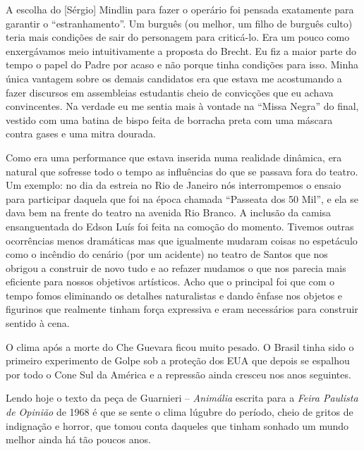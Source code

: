 A escolha do {[}Sérgio{]} Mindlin para fazer o operário foi pensada
exatamente para garantir o “estranhamento”. Um burguês (ou melhor, um
filho de burguês culto) teria mais condições de sair do personagem para
criticá-lo. Era um pouco como enxergávamos meio intuitivamente a
proposta do Brecht. Eu fiz a maior parte do tempo o papel do Padre por
acaso e não porque tinha condições para isso. Minha única vantagem sobre
os demais candidatos era que estava me acostumando a fazer discursos em
assembleias estudantis cheio de convicções que eu achava convincentes.
Na verdade eu me sentia mais à vontade na “Missa Negra” do final,
vestido com uma batina de bispo feita de borracha preta com uma máscara
contra gases e uma mitra dourada.

Como era uma performance que estava inserida numa realidade dinâmica,
era natural que sofresse todo o tempo as influências do que se passava
fora do teatro. Um exemplo: no dia da estreia no Rio de Janeiro nós
interrompemos o ensaio para participar daquela que foi na época chamada
“Passeata dos 50 Mil”, e ela se dava bem na frente do teatro na avenida
Rio Branco. A inclusão da camisa ensanguentada do Edson Luís foi feita
na comoção do momento. Tivemos outras ocorrências menos dramáticas mas
que igualmente mudaram coisas no espetáculo como o incêndio do cenário
(por um acidente) no teatro de Santos que nos obrigou a construir de
novo tudo e ao refazer mudamos o que nos parecia mais eficiente para
nossos objetivos artísticos. Acho que o principal foi que com o tempo
fomos eliminando os detalhes naturalistas e dando ênfase nos objetos e
figurinos que realmente tinham força expressiva e eram necessários para
construir sentido à cena.

O clima após a morte do Che Guevara ficou muito pesado. O Brasil tinha
sido o primeiro experimento de Golpe sob a proteção dos EUA que depois
se espalhou por todo o Cone Sul da América e a repressão ainda cresceu
nos anos seguintes.

Lendo hoje o texto da peça de Guarnieri -- \textit{Animália} escrita para a
\textit{Feira Paulista de Opinião} de 1968 é que se sente o clima lúgubre
do período, cheio de gritos de indignação e horror, que tomou conta
daqueles que tinham sonhado um mundo melhor ainda há tão poucos anos.

